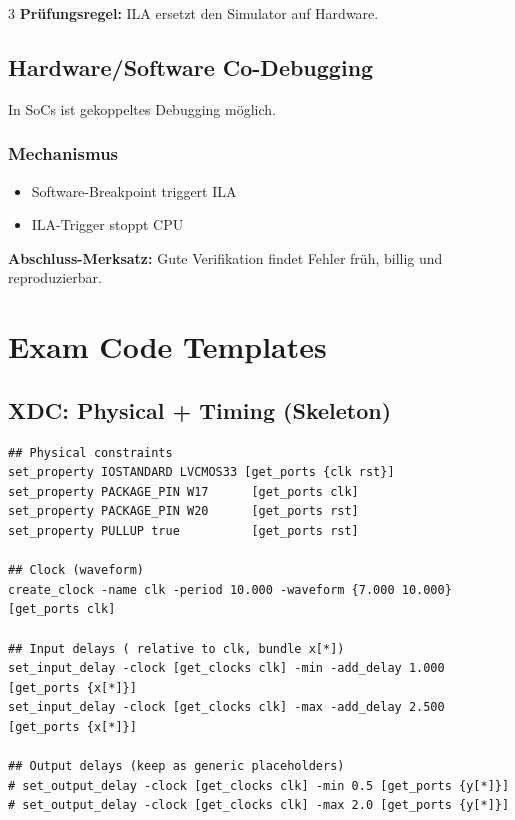 \documentclass[10pt,a4paper]{article}
\newcommand{\hilite}[1]{\colorbox{yellow!25}{#1}}
\newcommand{\imp}[1]{\textbf{\textcolor{codeemph}{#1}}}
\begin{document}
\begin{multicols}{3}
\imp{Prüfungsregel:}  
\hilite{ILA} \hilite{ersetzt} den \hilite{Simulator} auf Hardware.

\subsection{Hardware/Software Co-Debugging}
In SoCs ist gekoppeltes Debugging möglich.

\subsubsection*{Mechanismus}
\begin{itemize}
  \item Software-Breakpoint triggert ILA
  \item ILA-Trigger stoppt CPU
\end{itemize}

\imp{Abschluss-Merksatz:}  
\hilite{Gute} \hilite{Verifikation} \hilite{findet} Fehler früh, billig und reproduzierbar.

\section{Exam Code Templates}
\subsection{XDC: Physical + Timing (Skeleton)}
\begin{lstlisting}[style=xdc,language={},emph={set_property,IOSTANDARD,PACKAGE_PIN,PULLUP,create_clock,set_input_delay,set_output_delay,get_ports,get_clocks},emphstyle=\bfseries\color{codeemph}]
## Physical constraints
set_property IOSTANDARD LVCMOS33 [get_ports {clk rst}]
set_property PACKAGE_PIN W17      [get_ports clk]
set_property PACKAGE_PIN W20      [get_ports rst]
set_property PULLUP true          [get_ports rst]

## Clock (waveform)
create_clock -name clk -period 10.000 -waveform {7.000 10.000} [get_ports clk]

## Input delays ( relative to clk, bundle x[*])
set_input_delay -clock [get_clocks clk] -min -add_delay 1.000 [get_ports {x[*]}]
set_input_delay -clock [get_clocks clk] -max -add_delay 2.500 [get_ports {x[*]}]

## Output delays (keep as generic placeholders)
# set_output_delay -clock [get_clocks clk] -min 0.5 [get_ports {y[*]}]
# set_output_delay -clock [get_clocks clk] -max 2.0 [get_ports {y[*]}]
\end{lstlisting}


\end{multicols}
\end{document}
